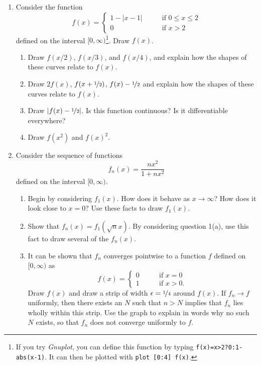 \documentclass[12pt]{article}
\begin{document}
\begin{enumerate}
  \item Consider the function
    \[
    f(x) = \left\{
    \begin{array}{ll}
      1-|x-1| & \qquad \textrm{if $0\le x\le 2$} \\
      0 & \qquad \textrm{if $x>2$}
    \end{array}
    \right.
    \]
    defined on the interval $[0,\infty)$\footnote[2]{If you try \textit{Gnuplot}, you
    can define this function by typing \texttt{f(x)=x>2?0:1-abs(x-1)}. It can
    then be plotted with \texttt{plot [0:4] f(x)}.}. Draw $f(x)$.
    \begin{enumerate}
      \item Draw $f(x/2)$, $f(x/3)$, and $f(x/4)$, and explain how the shapes
	of these curves relate to $f(x)$.
      \item Draw $2f(x)$, $f(x+\nicefrac{1}{2})$, $f(x)-\nicefrac{1}{2}$ and
	explain how the shapes of these curves relate to $f(x)$.
      \item Draw $|f(x)-\nicefrac{1}{2}|$. Is this function continuous? Is it
	differentiable everywhere?
      \item Draw $f(x^2)$ and $f(x)^2$.
    \end{enumerate}
  \item Consider the sequence of functions
    \[
    f_n(x) = \frac{nx^2}{1+nx^2}
    \]
    defined on the interval $[0,\infty)$.
    \begin{enumerate}
      \item Begin by considering $f_1(x)$. How does it behave as $x\to \infty$?
	How does it look close to $x=0$? Use these facts to draw $f_1(x)$.
      \item Show that $f_n(x)=f_1(\sqrt{n} x)$. By considering question 1(a),
	use this fact to draw several of the $f_n(x)$.
      \item It can be shown that $f_n$ converges pointwise to a function $f$
	defined on $[0,\infty)$ as
	\[
	f(x) = \left\{
	\begin{array}{ll}
	  0 & \qquad \textrm{if $x=0$} \\
	  1 & \qquad \textrm{if $x>0$.}
	\end{array}
	\right.
	\]
	Draw $f(x)$ and draw a strip of width $\epsilon=\nicefrac{1}{4}$
	around $f(x)$. If $f_n\to f$ uniformly, then there exists an
	$N$ such that $n>N$ implies that $f_n$ lies wholly within this strip.
	Use the graph to explain in words why no such $N$ exists,
	so that $f_n$ does not converge uniformly to $f$.

\end{enumerate}
\end{enumerate}
\end{document}
